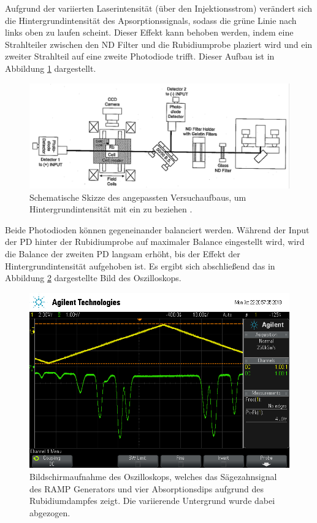 Aufgrund der variierten Laserintensität (über den Injektionsstrom) verändert sich
die Hintergrundintensität des Apsorptionssignals, sodass die grüne Linie nach
links oben zu laufen scheint. Dieser Effekt kann behoben werden, indem eine
Strahlteiler zwischen den ND Filter und die Rubidiumprobe plaziert wird und
ein zweiter Strahlteil auf eine zweite Photodiode trifft. Dieser Aufbau
ist in Abbildung \ref{fig:SetupImproved} dargestellt.

\begin{figure}
	\centering
	\includegraphics[width=\textwidth, angle=1, origin=c]{images/SetupImproved.pdf}
	\caption{Schematische Skizze des angepassten Versuchaufbaus,
	um Hintergrundintensität mit ein zu beziehen \cite{anleitung}.}
	\label{fig:SetupImproved}
\end{figure}

Beide Photodioden können gegeneinander balanciert werden.
Während der Input der PD hinter der
Rubidiumprobe auf maximaler Balance eingestellt wird, wird die
Balance der zweiten PD langsam erhöht, bis der Effekt der Hintergrundintensität
aufgehoben ist.
Es ergibt sich abschließend das in Abbildung \ref{fig:final-signal} dargestellte
Bild des Oszilloskops.

\begin{figure}
	\centering
	\includegraphics[width=.8\textwidth]{images/final-signal.png}
	\caption{Bildschirmaufnahme des Oszilloskops, welches das Sägezahnsignal des
	RAMP Generators und vier Absorptionsdips aufgrund des Rubidiumdampfes zeigt.
	Die variierende Untergrund wurde dabei abgezogen.}
	\label{fig:final-signal}
\end{figure}
